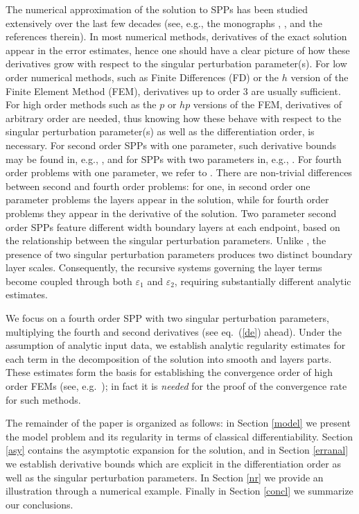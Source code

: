 \documentclass[12pt]{article}
\newcommand{\eps}{\varepsilon}
\begin{document}
The numerical approximation of the solution to SPPs has been studied extensively over the last few decades (see,
e.g., the monographs \cite{mos}, \cite{morton}, \cite{rst} and the references
therein).  In most numerical methods, derivatives of the exact solution
appear in the error estimates, hence one should have a clear picture of how
these derivatives grow with respect to the singular perturbation
parameter(s). For low order numerical methods, such as Finite Differences
(FD) or the $h$ version of the Finite Element Method (FEM), derivatives up
to order 3 are usually sufficient. For high order methods such as the $p$ or $hp$
versions of the FEM, derivatives of arbitrary order are needed, thus knowing
how these behave with respect to the singular perturbation parameter(s) as
well as the differentiation order, is necessary. For second order SPPs with one parameter,
such derivative bounds may be found in, e.g., \cite{melenk}, and for SPPs with two parameters
in, e.g., \cite{SX}. For fourth order problems with one parameter, we refer to
\cite{PC, PCarXiv}. There are non-trivial differences between second and fourth order problems: for one, in second order one parameter problems the layers appear in the solution, while for fourth order problems they appear in the derivative of the solution.  Two parameter second order SPPs feature different width boundary layers at each endpoint, based on the relationship between the singular perturbation parameters. Unlike \cite{PC, PCarXiv}, the presence of two singular perturbation parameters produces two distinct boundary layer scales. Consequently, the recursive systems governing the layer terms become coupled through both $\eps_1$ and $\eps_2$, requiring substantially different analytic estimates.

We focus on a fourth order SPP with two singular perturbation parameters, multiplying the fourth and second derivatives (see  eq.~(\ref{de}) ahead). Under the assumption of analytic input data, we establish analytic
regularity estimates for each term in the decomposition of the solution into smooth and layers parts. These estimates form the basis for establishing the convergence order of high order FEMs (see, e.g.~\cite{XFS}); in fact it is \emph{needed} for the proof of the convergence rate for such methods.

The remainder of the paper is organized as follows: in Section \ref{model} we present the model problem and its regularity in terms of classical differentiability. Section \ref{asy} contains the asymptotic expansion for
the solution, and in Section \ref{erranal} we establish derivative bounds which are explicit in the differentiation order as well as the singular perturbation parameters. In Section \ref{nr} we provide an illustration through a numerical example. Finally in Section \ref{concl} we summarize our conclusions.
\end{document}
